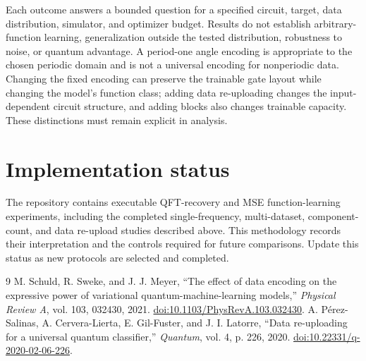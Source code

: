 \documentclass[11pt]{article}
\begin{document}
Each outcome answers a bounded question for a specified circuit, target, data distribution, simulator, and optimizer budget. Results do not establish arbitrary-function learning, generalization outside the tested distribution, robustness to noise, or quantum advantage. A period-one angle encoding is appropriate to the chosen periodic domain and is not a universal encoding for nonperiodic data. Changing the fixed encoding can preserve the trainable gate layout while changing the model's function class; adding data re-uploading changes the input-dependent circuit structure, and adding blocks also changes trainable capacity. These distinctions must remain explicit in analysis.

\section{Implementation status}

The repository contains executable QFT-recovery and MSE function-learning experiments, including the completed single-frequency, multi-dataset, component-count, and data re-upload studies described above. This methodology records their interpretation and the controls required for future comparisons. Update this status as new protocols are selected and completed.

\begin{thebibliography}{9}
M. Schuld, R. Sweke, and J. J. Meyer,
\newblock ``The effect of data encoding on the expressive power of variational quantum-machine-learning models,''
\newblock \emph{Physical Review A}, vol. 103, 032430, 2021.
\newblock \href{https://doi.org/10.1103/PhysRevA.103.032430}{doi:10.1103/PhysRevA.103.032430}.
A. P\'erez-Salinas, A. Cervera-Lierta, E. Gil-Fuster, and J. I. Latorre,
\newblock ``Data re-uploading for a universal quantum classifier,''
\newblock \emph{Quantum}, vol. 4, p. 226, 2020.
\newblock \href{https://doi.org/10.22331/q-2020-02-06-226}{doi:10.22331/q-2020-02-06-226}.
\end{thebibliography}
\end{document}
